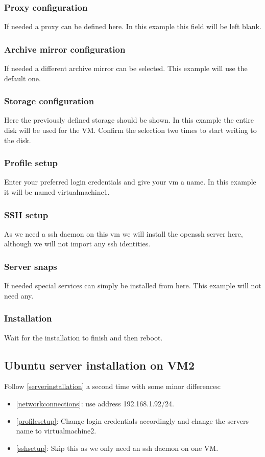 \documentclass[10pt,a4paper]{article}
\begin{document}
\subsubsection{Proxy configuration}
If needed a proxy can be defined here. In this example this field will be left blank.

\subsubsection{Archive mirror configuration}
If needed a different archive mirror can be selected. This example will use the default one.

\subsubsection{Storage configuration}
Here the previously defined storage should be shown. In this example the entire disk will be used for the VM. Confirm the selection two times to start writing to the disk.

\subsubsection{Profile setup}
\label{profilesetup}
Enter your preferred login credentials and give your vm a name. In this example it will be named virtualmachine1.

\subsubsection{SSH setup}
\label{sshsetup}
As we need a ssh daemon on this vm we will install the openssh server here, although we will not import any ssh identities.

\subsubsection{Server snaps}
If needed special services can simply be installed from here. This example will not need any.

\subsubsection{Installation}
Wait for the installation to finish and then reboot.

\subsection{Ubuntu server installation on VM2}
Follow \autoref{serverinstallation} a second time with some minor differences:
\begin{itemize}
\item \autoref{networkconnections}: use address 192.168.1.92/24.
\item \autoref{profilesetup}: Change login credentials accordingly and change the servers name to virtualmachine2.
\item \autoref{sshsetup}: Skip this as we only need an ssh daemon on one VM.
\end{itemize}
\end{document}
